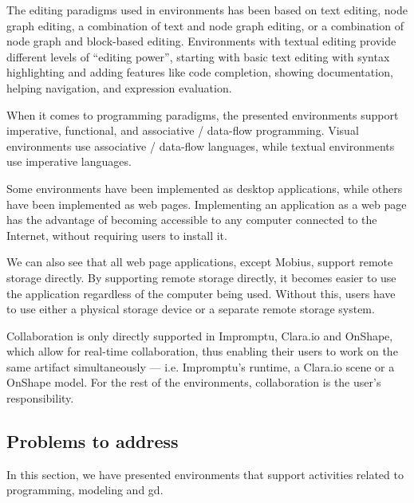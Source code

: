 The editing paradigms used in environments has been based on text editing, node graph editing, a combination of text and node graph editing, or a combination of node graph and block-based editing.
Environments with textual editing provide different levels of ``editing power'', starting with basic text editing with syntax highlighting and adding features like code completion, showing documentation, helping navigation, and expression evaluation.

When it comes to programming paradigms, the presented environments support imperative, functional, and associative / data-flow programming.
Visual environments use associative / data-flow languages, while textual environments use imperative languages.


Some environments have been implemented as desktop applications, while others have been implemented as web pages.%
Implementing an application as a web page has the advantage of becoming accessible to any computer connected to the Internet, without requiring users to install it.

We can also see that all web page applications, except Mobius\cite{Janssen2016}, support remote storage directly.
By supporting remote storage directly, it becomes easier to use the application regardless of the computer being used.
Without this, users have to use either a physical storage device or a separate remote storage system.

Collaboration is only directly supported in Impromptu, Clara.io and OnShape, which allow for real-time collaboration, thus enabling their users to work on the same artifact simultaneously --- i.e. Impromptu's runtime, a Clara.io scene or a OnShape model.
For the rest of the environments, collaboration is the user's responsibility.


\subsection{Problems to address}
In this section, we have presented environments that support activities related to programming, modeling and \gls{gd}.

